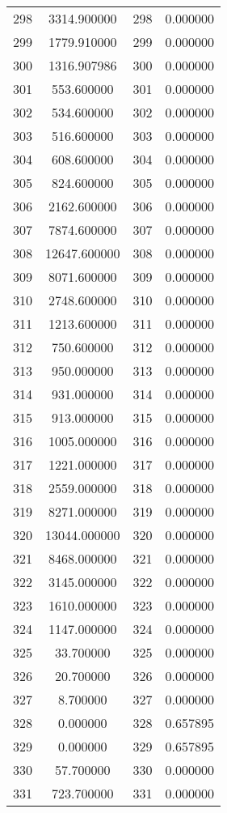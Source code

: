 \documentclass[12pt]{article}
\begin{document}
\begin{longtable}{@{}cccc@{}}
298 & 3314.900000 & 298 & 0.000000 \\
299 & 1779.910000 & 299 & 0.000000 \\
300 & 1316.907986 & 300 & 0.000000 \\
301 & 553.600000 & 301 & 0.000000 \\
302 & 534.600000 & 302 & 0.000000 \\
303 & 516.600000 & 303 & 0.000000 \\
304 & 608.600000 & 304 & 0.000000 \\
305 & 824.600000 & 305 & 0.000000 \\
306 & 2162.600000 & 306 & 0.000000 \\
307 & 7874.600000 & 307 & 0.000000 \\
308 & 12647.600000 & 308 & 0.000000 \\
309 & 8071.600000 & 309 & 0.000000 \\
310 & 2748.600000 & 310 & 0.000000 \\
311 & 1213.600000 & 311 & 0.000000 \\
312 & 750.600000 & 312 & 0.000000 \\
313 & 950.000000 & 313 & 0.000000 \\
314 & 931.000000 & 314 & 0.000000 \\
315 & 913.000000 & 315 & 0.000000 \\
316 & 1005.000000 & 316 & 0.000000 \\
317 & 1221.000000 & 317 & 0.000000 \\
318 & 2559.000000 & 318 & 0.000000 \\
319 & 8271.000000 & 319 & 0.000000 \\
320 & 13044.000000 & 320 & 0.000000 \\
321 & 8468.000000 & 321 & 0.000000 \\
322 & 3145.000000 & 322 & 0.000000 \\
323 & 1610.000000 & 323 & 0.000000 \\
324 & 1147.000000 & 324 & 0.000000 \\
325 & 33.700000 & 325 & 0.000000 \\
326 & 20.700000 & 326 & 0.000000 \\
327 & 8.700000 & 327 & 0.000000 \\
328 & 0.000000 & 328 & 0.657895 \\
329 & 0.000000 & 329 & 0.657895 \\
330 & 57.700000 & 330 & 0.000000 \\
331 & 723.700000 & 331 & 0.000000 \\

\end{longtable}
\end{document}
